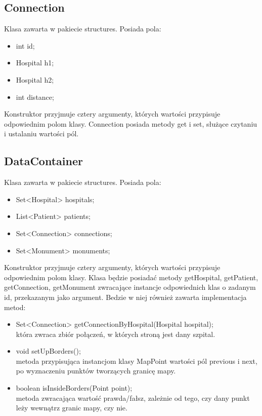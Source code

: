 \documentclass{article}
\begin{document}
    \subsection{Connection}
    Klasa zawarta w pakiecie structures. Posiada pola:
    \begin{itemize}
        \item int id;
        \item Hospital h1;
        \item Hospital h2;
        \item int distance;
    \end{itemize}
    Konstruktor przyjmuje cztery argumenty, których wartości przypisuje odpowiednim polom klasy. Connection posiada metody get i set, służące czytaniu i ustalaniu wartości pól.

    \subsection{DataContainer}
    Klasa zawarta w pakiecie structures. Posiada pola:
    \begin{itemize}
        \item Set<Hospital> hospitals;
        \item List<Patient> patients;
        \item Set<Connection> connections;
        \item Set<Monument> monuments;
    \end{itemize}
    Konstruktor przyjmuje cztery argumenty, których wartości przypisuje odpowiednim polom klasy. Klasa będzie posiadać metody getHospital, getPatient, getConnection, getMonument zwracające instancje odpowiednich klas o zadanym id, przekazanym jako argument. Bedzie w niej również zawarta implementacja metod:
    \begin{itemize}
        \item Set<Connection> getConnectionByHospital(Hospital hospital); \\
        która zwraca zbiór połączeń, w których stroną jest dany szpital.

        \item void setUpBorders(); \\
        metoda przypisująca instancjom klasy MapPoint wartości pól previous i next, po wyznaczeniu punktów tworzących granicę mapy.

        \item boolean isInsideBorders(Point point); \\
        metoda zwracająca wartość prawda/fałsz, zależnie od tego, czy dany punkt leży wewnątrz granic mapy, czy nie.
    \end{itemize}
\end{document}
